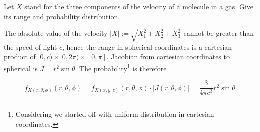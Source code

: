 

Let $X$ stand for the three components of the velocity of a molecule in a gas.
Give its range and probability distribution.


The absolute value of the velocity $|X| := \sqrt{X_1^2 + X_2^2 + X_3^2}$ cannot be greater than the speed of light $c$, hence the range in spherical coordinates is a cartesian product of $[0, c) \times [0, 2 \pi) \times [0 , \pi]$. Jacobian from cartesian coordinates to spherical is $J = r^2 \sin{\theta}$. The probability\footnote{Considering we started off with uniform distribution in cartesian coordinates.} is therefore

\begin{equation*}
    f_{X(r, \theta, \phi)}(r, \theta, \phi) = f_{X(x, y ,z)}(r, \theta, \phi) \cdot |J (r, \theta, \phi)| = \frac{3}{4 \pi c^3} r^2 \sin{\theta}
\end{equation*}